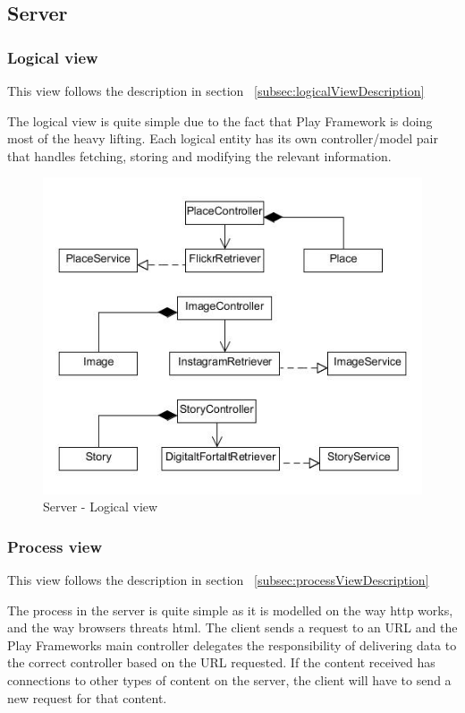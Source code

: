 \documentclass[11pt]{book}
\begin{document}
\subsection{Server}

\subsubsection{Logical view}
This view follows the description in section ~\ref{subsec:logicalViewDescription}

The logical view is quite simple due to the fact that Play Framework is doing most of the heavy lifting. Each logical entity has its own controller/model pair that handles fetching, storing and modifying the relevant information.

\begin{figure}[H]
      \centering
      \includegraphics[width=1.0\textwidth]{Figures/Architecture/serverLogical.jpg}
      \caption{Server - Logical view}
      \label{fig:arch_server_logical}
\end{figure}

\subsubsection{Process view}
This view follows the description in section ~\ref{subsec:processViewDescription}

The process in the server is quite simple as it is modelled on the way \gls{http} works, and the way browsers threats \gls{html}. The client sends a request to an URL and the Play Frameworks main controller delegates the  responsibility of delivering data to the correct controller based on the URL requested. If the content received has connections to other types of content on the server, the client will have to send a new request for that content.
\end{document}
